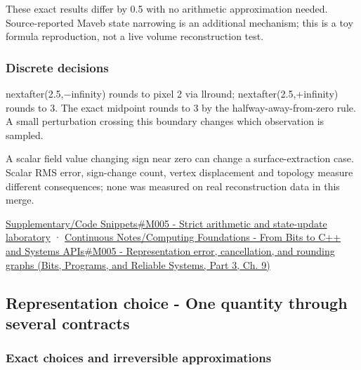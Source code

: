 These exact results differ by 0.5 with no arithmetic approximation needed. Source-reported Maveb state narrowing is an additional mechanism; this is a toy formula reproduction, not a live volume reconstruction test.

\subsubsection{Discrete decisions}\label{appendix-92ff77d4dfdc-discrete-decisions}

\hypertarget{appendix-92ff77d4dfdc-discrete-decisions}{}

nextafter(2.5,−infinity) rounds to pixel 2 via llround; nextafter(2.5,+infinity) rounds to 3. The exact midpoint rounds to 3 by the halfway-away-from-zero rule. A small perturbation crossing this boundary changes which observation is sampled.

A scalar field value changing sign near zero can change a surface-extraction case. Scalar RMS error, sign-change count, vertex displacement and topology measure different consequences; none was measured on real reconstruction data in this merge.

\hyperref[appendix-4e2236f53445-m005---strict-arithmetic-and-state-update-laboratory]{Supplementary/Code Snippets\#M005 - Strict arithmetic and state-update laboratory} · \href{../01-Bits-Programs-and-Reliable-Systems-P03/main.pdf\#01-foundations-i-ch011-m005---representation-error-cancellation-and-rounding-graphs}{Continuous Notes/Computing Foundations - From Bits to C++ and Systems APIs\#M005 - Representation error, cancellation, and rounding graphs (Bits, Programs, and Reliable Systems, Part 3, Ch. 9)}

\subsection{Representation choice - One quantity through several contracts}\label{appendix-92ff77d4dfdc-representation-choice---one-quantity-through-several-contracts}

\hypertarget{appendix-92ff77d4dfdc-representation-choice---one-quantity-through-several-contracts}{}

\subsubsection{Exact choices and irreversible approximations}\label{appendix-92ff77d4dfdc-exact-choices-and-irreversible-approximations}

